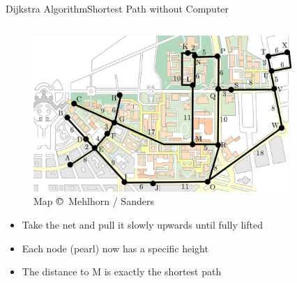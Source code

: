 \begin{frame}{Dijkstra Algorithm}{Shortest Path without Computer}
  \vspace{-1.5em}
  \begin{columns}
    \begin{column}{0.55\linewidth}
      \begin{figure}[!t]
        \includegraphics[width=0.8\linewidth]
          {Images/Dijkstra/DijkstraMap}
        \caption{Map $\copyright\,$ Mehlhorn / Sanders}
      \end{figure}
      \vspace{-1.5em}
      \begin{itemize}
        \item
          Take the net and pull it slowly upwards until fully lifted
        \item
          Each node (pearl) now has a specific height
        \item
          The distance to M is exactly the {\color{Mittel-Blau}shortest path}
      \end{itemize}
    \end{column}
    \begin{column}{0.45\linewidth}
      \begin{figure}[!t]

\end{figure}
\end{column}
\end{columns}
\end{frame}
